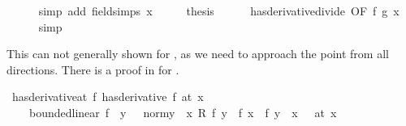 \begin{isabellebody}
\ \ \ \ \isamarkupfalse%
\ {\isacharparenleft}{\kern0pt}simp\ add{\isacharcolon}{\kern0pt}\ field{\isacharunderscore}{\kern0pt}simps\ x{\isacharparenright}{\kern0pt}\isanewline
\ \ \isamarkupfalse%
\ \isamarkupfalse%
\ {\isacharquery}{\kern0pt}thesis\isanewline
\ \ \ \ \isamarkupfalse%
\ has{\isacharunderscore}{\kern0pt}derivative{\isacharunderscore}{\kern0pt}divide\ {\isacharbrackleft}{\kern0pt}OF\ f\ g{\isacharbrackright}{\kern0pt}\ x\isanewline
\ \ \ \ \isamarkupfalse%
\ simp\isanewline
{}\isamarkupfalse%
%
\endisatagproof
{\isafoldproof}%
%
\isadelimproof
%
\endisadelimproof
%
\isadelimdocument
%
\endisadelimdocument
%
\isatagdocument
%
\isamarkuptrue%
%
\endisatagdocument
{\isafolddocument}%
%
\isadelimdocument
%
\endisadelimdocument
%
\begin{isamarkuptext}%
This can not generally shown for , as we need to approach the point from
all directions. There is a proof in  for .%
\end{isamarkuptext}\isamarkuptrue%
\isamarkupfalse%
\ has{\isacharunderscore}{\kern0pt}derivative{\isacharunderscore}{\kern0pt}at{}{\isacharcolon}{\kern0pt}\ {\isachardoublequoteopen}{\isacharparenleft}{\kern0pt}f\ has{\isacharunderscore}{\kern0pt}derivative\ f{\isacharprime}{\kern0pt}{\isacharparenright}{\kern0pt}\ {\isacharparenleft}{\kern0pt}at\ x{\isacharparenright}{\kern0pt}\ {\isasymlongleftrightarrow}\isanewline
\ \ \ \ bounded{\isacharunderscore}{\kern0pt}linear\ f{\isacharprime}{\kern0pt}\ {\isasymand}\ {\isacharparenleft}{\kern0pt}{\isacharparenleft}{\kern0pt}{\isasymlambda}y{\isachardot}{\kern0pt}\ {\isacharparenleft}{\kern0pt}{}\ {\isacharslash}{\kern0pt}\ {\isacharparenleft}{\kern0pt}norm{\isacharparenleft}{\kern0pt}y\ {\isacharminus}{\kern0pt}\ x{\isacharparenright}{\kern0pt}{\isacharparenright}{\kern0pt}{\isacharparenright}{\kern0pt}\ {\isacharasterisk}{\kern0pt}\isactrlsub R\ {\isacharparenleft}{\kern0pt}f\ y\ {\isacharminus}{\kern0pt}\ {\isacharparenleft}{\kern0pt}f\ x\ {\isacharplus}{\kern0pt}\ f{\isacharprime}{\kern0pt}\ {\isacharparenleft}{\kern0pt}y\ {\isacharminus}{\kern0pt}\ x{\isacharparenright}{\kern0pt}{\isacharparenright}{\kern0pt}{\isacharparenright}{\kern0pt}{\isacharparenright}{\kern0pt}\ {\isasymlonglongrightarrow}\ {}{\isacharparenright}{\kern0pt}\ {\isacharparenleft}{\kern0pt}at\ x{\isacharparenright}{\kern0pt}{\isachardoublequoteclose}\isanewline

\end{isabellebody}

